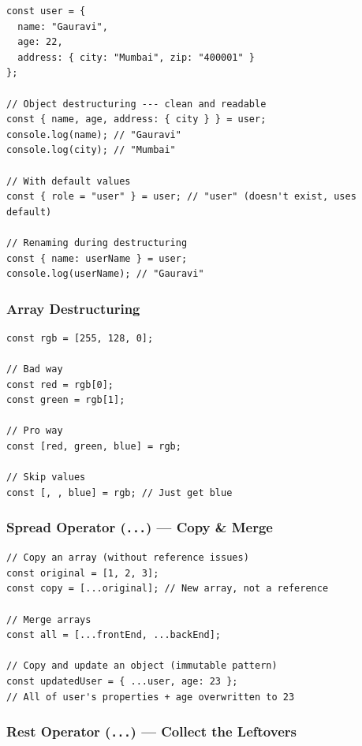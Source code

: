 \documentclass[12pt]{article}
\begin{document}
\begin{proway}
\begin{lstlisting}
const user = {
  name: "Gauravi",
  age: 22,
  address: { city: "Mumbai", zip: "400001" }
};

// Object destructuring --- clean and readable
const { name, age, address: { city } } = user;
console.log(name); // "Gauravi"
console.log(city); // "Mumbai"

// With default values
const { role = "user" } = user; // "user" (doesn't exist, uses default)

// Renaming during destructuring
const { name: userName } = user;
console.log(userName); // "Gauravi"
\end{lstlisting}
\end{proway}

\subsubsection*{Array Destructuring}

\begin{lstlisting}
const rgb = [255, 128, 0];

// Bad way
const red = rgb[0];
const green = rgb[1];

// Pro way
const [red, green, blue] = rgb;

// Skip values
const [, , blue] = rgb; // Just get blue
\end{lstlisting}

\subsubsection*{Spread Operator (\texttt{...}) --- Copy \& Merge}

\begin{lstlisting}
// Copy an array (without reference issues)
const original = [1, 2, 3];
const copy = [...original]; // New array, not a reference

// Merge arrays
const all = [...frontEnd, ...backEnd];

// Copy and update an object (immutable pattern)
const updatedUser = { ...user, age: 23 };
// All of user's properties + age overwritten to 23
\end{lstlisting}

\subsubsection*{Rest Operator (\texttt{...}) --- Collect the Leftovers}
\end{document}
